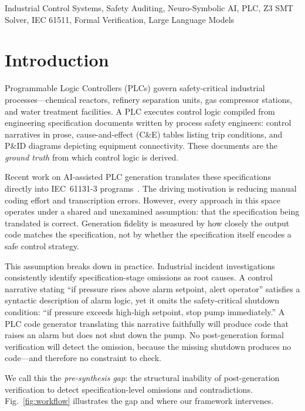 \documentclass[conference]{IEEEtran}
\begin{document}
\begin{IEEEkeywords}
Industrial Control Systems, Safety Auditing, Neuro-Symbolic AI, PLC,
Z3 SMT Solver, IEC 61511, Formal Verification, Large Language Models
\end{IEEEkeywords}

\section{Introduction}

Programmable Logic Controllers (PLCs) govern safety-critical
industrial processes---chemical reactors, refinery separation units,
gas compressor stations, and water treatment facilities. A PLC executes
control logic compiled from engineering specification documents written
by process safety engineers: control narratives in prose, cause-and-effect
(C\&E) tables listing trip conditions, and P\&ID diagrams depicting equipment
connectivity. These documents are the \emph{ground truth} from which
control logic is derived.

Recent work on AI-assisted PLC generation translates these specifications
directly into IEC~61131-3 programs~\cite{paliwal2021digitize,koziolek2023chatgpt,
fakih2024llm4plc}. The driving motivation is reducing manual coding effort
and transcription errors. However, every approach in this space operates
under a shared and unexamined assumption: that the specification being
translated is correct. Generation fidelity is measured by how closely
the output code matches the specification, not by whether the specification
itself encodes a safe control strategy.

This assumption breaks down in practice. Industrial incident investigations
consistently identify specification-stage omissions as root causes. A
control narrative stating ``if pressure rises above alarm setpoint, alert
operator'' satisfies a syntactic description of alarm logic, yet it omits
the safety-critical shutdown condition: ``if pressure exceeds high-high
setpoint, stop pump immediately.'' A PLC code generator translating this
narrative faithfully will produce code that raises an alarm but does not
shut down the pump. No post-generation formal verification will detect the
omission, because the missing shutdown produces no code---and therefore no
constraint to check.

We call this the \emph{pre-synthesis gap}: the structural inability of
post-generation verification to detect specification-level omissions
and contradictions. Fig.~\ref{fig:workflow} illustrates the gap and
where our framework intervenes.
\end{document}
